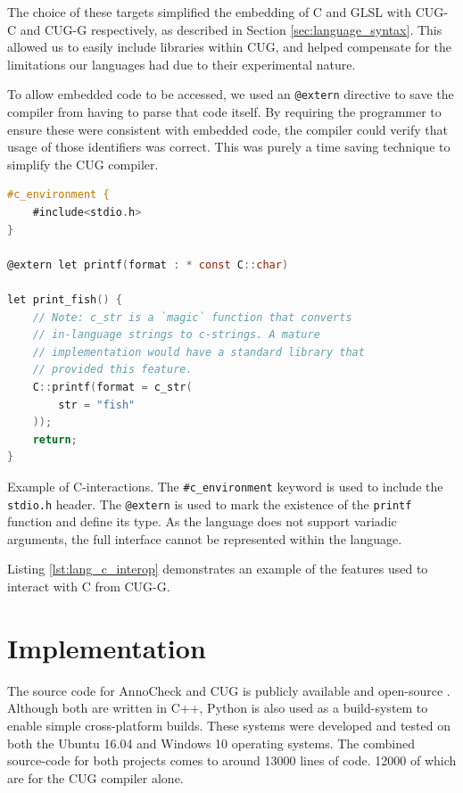 \documentclass[a4paper,12pt,twoside,openright]{report}
\def\totalloccount{13000 }
\def\compilerloccount{12000 }
\begin{document}
The choice of these targets simplified the embedding of C and GLSL with CUG-C
and CUG-G respectively, as described in Section \ref{sec:language_syntax}. This
allowed us to easily include libraries within CUG, and helped compensate for
the limitations our languages had due to their experimental nature.

To allow embedded code to be accessed, we used an \texttt{@extern} directive to
save the compiler from having to parse that code itself. By requiring the
programmer to ensure these were consistent with embedded code, the compiler
could verify that usage of those identifiers was correct. This was purely a
time saving technique to simplify the CUG compiler.


\begin{lstfloat}
\begin{lstlisting}[language=C]
#c_environment {
    #include<stdio.h>
}

@extern let printf(format : * const C::char)

let print_fish() {
    // Note: c_str is a `magic` function that converts
    // in-language strings to c-strings. A mature
    // implementation would have a standard library that
    // provided this feature.
    C::printf(format = c_str(
        str = "fish"
    ));
    return;
}
\end{lstlisting}
\caption{Example of C-interactions. The \texttt{\#c\_environment} keyword is
used to include the \texttt{stdio.h} header. The \texttt{@extern} is used to
mark the existence of the \texttt{printf} function and define its type. As the
language does not support variadic arguments, the full interface cannot be
represented within the language.}
\label{lst:lang_c_interop}
\end{lstfloat}

Listing \ref{lst:lang_c_interop} demonstrates an example of the features used
to interact with C from CUG-G.

\chapter{Implementation}

\label{chp:implementation}


The source code for AnnoCheck and CUG is publicly available and open-source
\cite{ProjectSource}. Although both are written in C++, Python is also used as
a build-system to enable simple cross-platform builds. These systems were
developed and tested on both the Ubuntu 16.04 and Windows 10 operating systems.
The combined source-code for both projects comes to around \totalloccount lines
of code. \compilerloccount of which are for the CUG compiler alone.
\end{document}
